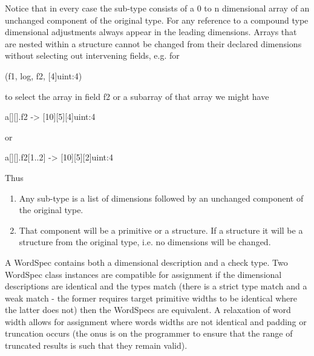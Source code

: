 \documentclass[10pt,a4paper,twoside,fleqn]{book}
\begin{document}
    Notice that in every case the sub-type consists of a 0 to n
    dimensional array of an unchanged component of the original type.
    For any reference to a compound type dimensional adjustments always
    appear in the leading dimensions. Arrays that are nested within
    a structure cannot be changed from their declared dimensions without
    selecting out intervening fields, e.g. for

    \begin{verbatimtab}
        [10][5](f1, log, f2, [4]uint:4)
    \end{verbatimtab}

    to select the array in field f2 or a subarray of that array we might have

    \begin{verbatimtab}
        a[][].f2 -> [10][5][4]uint:4
    \end{verbatimtab}

    or

    \begin{verbatimtab}
        a[][].f2[1..2] -> [10][5][2]uint:4
    \end{verbatimtab}

    Thus
    \begin{enumerate}
    \item   Any sub-type is a list of dimensions followed by an unchanged
           component of the original type.
    \item   That component will be a primitive or a structure. If a structure
           it will be a structure from the original type, i.e. no dimensions
           will be changed.
    \end{enumerate}

    A WordSpec contains both a dimensional description and a check
    type. Two WordSpec class instances are compatible for assignment
    if the dimensional descriptions are identical and the types
    match (there is a strict type match and a weak match - the former
    requires target primitive widths to be identical where the latter
    does not) then the WordSpecs are equivalent. A relaxation of word width
    allows for assignment where words widths are not identical and padding
    or truncation occurs (the onus is on the programmer to ensure that
    the range of truncated results is such that they remain valid).








        


    
\end{document}
